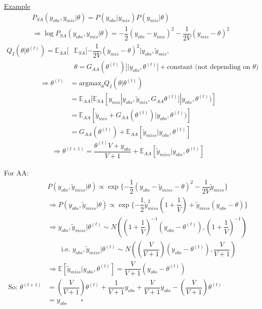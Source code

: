 \documentclass[12pt]{article}
\begin{document}
\begin{flushleft}
\bigskip
\underline{Example}
\begin{align*}
&P_{SA}(y_{obs},y_{mis}|\theta) = P(y_{obs}|y_{mis})P(y_{mis}|\theta)\\
&\Longrightarrow \log P_{SA}(y_{obs},y_{mis}|\theta)= -\dfrac{1}{2}(y_{obs}-y_{mis})^2-\dfrac{1}{2V}(y_{mis}-\theta)^2
\end{align*}
\begin{equation*} 
\begin{split} 
Q_I(\theta|\theta^{(t)})=\mathbb{E}_{AA}[ & \mathbb{E}_{SA}[-\dfrac{1}{2V}(y_{mis}-\theta)^2|y_{obs}, \tilde{y}_{mis}, \\
& \theta=G_{AA}(\theta^{(t)})]| y_{obs}, \theta^{(t)}] + \text{constant (not depending on  $\theta$)} 
\end{split}
\end{equation*}
\begin{align*}
\Longrightarrow \theta^{(t)} &= \textrm{argmax}_{\theta}Q_I(\theta|\theta^{(t)}) \\
 &= \mathbb{E}_{AA}[\mathbb{E}_{SA}[y_{mis}|y_{obs},\tilde{y}_{mis},G_{AA}\theta^{(t)}]|y_{obs}, \theta^{(t)})]\\
& = \mathbb{E}_{AA}[\tilde{y}_{mis}+G_{AA}(\theta^{(t)})|y_{obs},\theta^{(t)})]\\
& = G_{AA}(\theta^{(t)})+ \mathbb{E}_{AA}[\tilde{y}_{miss}|y_{obs},\theta^{(t)}]
\end{align*}
\begin{equation*}
\Longrightarrow \theta^{(t+1)}= \dfrac{ \theta^{(t)}V+y_{obs}}{V+1}+\mathbb{E}_{AA}[\tilde{y}_{miss}|y_{obs},\theta^{(t)}]
\end{equation*}\\
\bigskip
For AA:
\begin{align*}
& P(y_{obs},\tilde{y}_{miss}|\theta)\propto \exp \{-\dfrac{1}{2}(y_{obs}-\tilde{y}_{miss}-\theta)^2-\dfrac{1}{2V}\tilde{y}_{miss}\}\\
& \Longrightarrow P(y_{obs},\tilde{y}_{miss}|\theta)\propto \exp \{ -\dfrac{1}{2}\tilde{y}_{miss}^2(1+\dfrac{1}{V})+ \tilde{y}_{miss}(y_{obs}-\theta) \}\\
& \Longrightarrow y_{obs},\tilde{y}_{miss}|\theta^{(t)} \sim N((1+\dfrac{1}{V})^{-1}(y_{obs}-\theta^{(t)}), (1+\dfrac{1}{V})^{-1})\\
& \qquad \text{i.e. }  y_{obs},\tilde{y}_{miss}|\theta^{(t)} \sim N((\dfrac{V}{V+1})(y_{obs}-\theta^{(t)}), \dfrac{V}{V+1})\\
& \Longrightarrow \mathbb{E}[\tilde{y}_{miss}|y_{obs},\theta^{(t)}]=\dfrac{V}{V+1}(y_{obs}-\theta^{(t)})\\
\text{So: } \theta^{(t+1)}&=(\dfrac{V}{V+1}) \theta^{(t)}+\dfrac{1}{V+1}y_{obs}+\dfrac{V}{V+1}y_{obs}-(\dfrac{V}{V+1}) \theta^{(t)}\\
& = y_{obs} \qquad  \square
\end{align*}


\end{flushleft}
\end{document}
